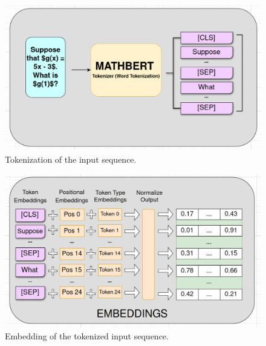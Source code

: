 \documentclass{article}
\begin{document}
\begin{figure}[H]
  \centering
  \includegraphics[width=\textwidth]{./figures/tokenization.png}
  \caption{Tokenization of the input sequence.}
  \label{fig:tokenization}
\end{figure}

\begin{figure}[H]
  \centering
  \includegraphics[width=\textwidth]{./figures/embeddings.png}
  \caption{Embedding of the tokenized input sequence.}
  \label{fig:embeddings}
\end{figure}
\end{document}
